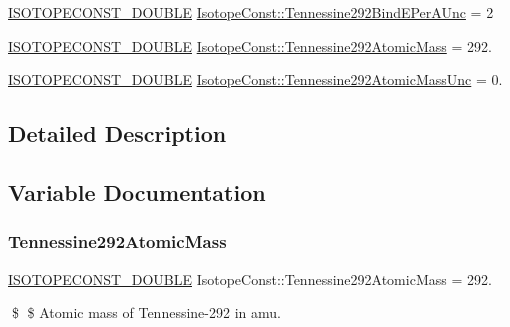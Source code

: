 \begin{DoxyCompactItemize}
\mbox{\hyperlink{group___isotope_const-_macros_ga8f45a7272ce02c0b4c65c44636ed719a}{I\+S\+O\+T\+O\+P\+E\+C\+O\+N\+S\+T\+\_\+\+D\+O\+U\+B\+LE}} \mbox{\hyperlink{group___isotope_const-_tennessine-_ts292_gacc8ac8642bc2d58b61a05dcec4ae54e5}{Isotope\+Const\+::\+Tennessine292\+Bind\+E\+Per\+A\+Unc}} = 2
\item 
\mbox{\hyperlink{group___isotope_const-_macros_ga8f45a7272ce02c0b4c65c44636ed719a}{I\+S\+O\+T\+O\+P\+E\+C\+O\+N\+S\+T\+\_\+\+D\+O\+U\+B\+LE}} \mbox{\hyperlink{group___isotope_const-_tennessine-_ts292_ga8ef20bbcb24965e9b7f3154c6109f55e}{Isotope\+Const\+::\+Tennessine292\+Atomic\+Mass}} = 292.
\item 
\mbox{\hyperlink{group___isotope_const-_macros_ga8f45a7272ce02c0b4c65c44636ed719a}{I\+S\+O\+T\+O\+P\+E\+C\+O\+N\+S\+T\+\_\+\+D\+O\+U\+B\+LE}} \mbox{\hyperlink{group___isotope_const-_tennessine-_ts292_gad18db996d156eb131856a49fc4d04cae}{Isotope\+Const\+::\+Tennessine292\+Atomic\+Mass\+Unc}} = 0.
\end{DoxyCompactItemize}


\subsection{Detailed Description}


\subsection{Variable Documentation}
\mbox{\label{group___isotope_const-_tennessine-_ts292_ga8ef20bbcb24965e9b7f3154c6109f55e}} 
\subsubsection{\texorpdfstring{Tennessine292\+Atomic\+Mass}{Tennessine292AtomicMass}}
{\footnotesize\ttfamily \mbox{\hyperlink{group___isotope_const-_macros_ga8f45a7272ce02c0b4c65c44636ed719a}{I\+S\+O\+T\+O\+P\+E\+C\+O\+N\+S\+T\+\_\+\+D\+O\+U\+B\+LE}} Isotope\+Const\+::\+Tennessine292\+Atomic\+Mass = 292.}

\$ \$ Atomic mass of Tennessine-\/292 in amu. \mbox{\label{group___isotope_const-_tennessine-_ts292_gad18db996d156eb131856a49fc4d04cae}} 
